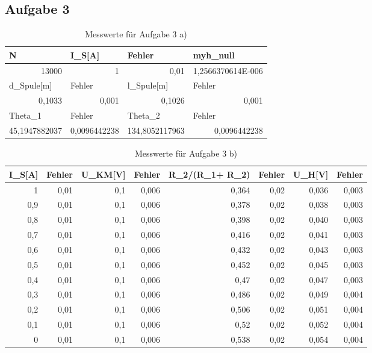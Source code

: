 \documentclass[12pt]{scrartcl}
\begin{document}
\subsection{Aufgabe 3}
\begin{table}[htbp]
\caption{Messwerte für Aufgabe 3 a)}
\begin{center}
\begin{tabular}{|l|l|l|l|}
\hline
N & I\_S[A] & Fehler & myh\_null \\ \hline
\multicolumn{1}{|r|}{13000} & \multicolumn{1}{r|}{1} & \multicolumn{1}{r|}{0,01} & \multicolumn{1}{r|}{1,2566370614E-006} \\ \hline
d\_Spule[m] & Fehler & l\_Spule[m] & Fehler \\ \hline
\multicolumn{1}{|r|}{0,1033} & \multicolumn{1}{r|}{0,001} & \multicolumn{1}{r|}{0,1026} & \multicolumn{1}{r|}{0,001} \\ \hline
Theta\_1 & Fehler & Theta\_2 & Fehler \\ \hline
\multicolumn{1}{|r|}{45,1947882037} & \multicolumn{1}{r|}{0,0096442238} & \multicolumn{1}{r|}{134,8052117963} & \multicolumn{1}{r|}{0,0096442238} \\ \hline
\end{tabular}
\end{center}
\label{aufgabe_3_a}
\end{table}

\begin{table}[htbp]
\caption{Messwerte für Aufgabe 3 b)}
\begin{center}
\begin{tabular}{|r|r|r|r|r|r|r|r|}
\hline
\multicolumn{1}{|l|}{I\_S[A]} & \multicolumn{1}{l|}{Fehler} & \multicolumn{1}{l|}{U\_KM[V]} & \multicolumn{1}{l|}{Fehler} & \multicolumn{1}{l|}{R\_2/(R\_1+ R\_2)} & \multicolumn{1}{l|}{Fehler} & \multicolumn{1}{l|}{U\_H[V]} & \multicolumn{1}{l|}{Fehler} \\ \hline
1 & 0,01 & 0,1 & 0,006 & 0,364 & 0,02 & 0,036 & 0,003 \\ \hline
0,9 & 0,01 & 0,1 & 0,006 & 0,378 & 0,02 & 0,038 & 0,003 \\ \hline
0,8 & 0,01 & 0,1 & 0,006 & 0,398 & 0,02 & 0,040 & 0,003 \\ \hline
0,7 & 0,01 & 0,1 & 0,006 & 0,416 & 0,02 & 0,041 & 0,003 \\ \hline
0,6 & 0,01 & 0,1 & 0,006 & 0,432 & 0,02 & 0,043 & 0,003 \\ \hline
0,5 & 0,01 & 0,1 & 0,006 & 0,452 & 0,02 & 0,045 & 0,003 \\ \hline
0,4 & 0,01 & 0,1 & 0,006 & 0,47 & 0,02 & 0,047 & 0,003 \\ \hline
0,3 & 0,01 & 0,1 & 0,006 & 0,486 & 0,02 & 0,049 & 0,004 \\ \hline
0,2 & 0,01 & 0,1 & 0,006 & 0,506 & 0,02 & 0,051 & 0,004 \\ \hline
0,1 & 0,01 & 0,1 & 0,006 & 0,52 & 0,02 & 0,052 & 0,004 \\ \hline
0 & 0,01 & 0,1 & 0,006 & 0,538 & 0,02 & 0,054 & 0,004 \\ \hline
\end{tabular}
\end{center}
\label{aufgabe_3_b}
\end{table}
\end{document}
